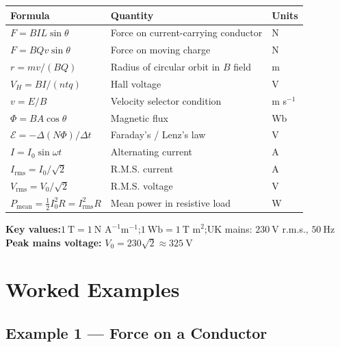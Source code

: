 \begin{minipage}{\linewidth}
\begin{tcolorbox}[colback=lightgold, colframe=accentgold]
\renewcommand{\arraystretch}{1.8}
\begin{tabular}{@{}lll@{}}
\toprule
\textbf{Formula} & \textbf{Quantity} & \textbf{Units} \\
\midrule
$F = BIL\sin\theta$ & Force on current-carrying conductor & N \\
$F = BQv\sin\theta$ & Force on moving charge & N \\
$r = mv/(BQ)$ & Radius of circular orbit in $B$ field & m \\
$V_H = BI/(ntq)$ & Hall voltage & V \\
$v = E/B$ & Velocity selector condition & m s$^{-1}$ \\
$\Phi = BA\cos\theta$ & Magnetic flux & Wb \\
$\mathcal{E} = -\Delta(N\Phi)/\Delta t$ & Faraday's / Lenz's law & V \\
$I = I_0\sin\omega t$ & Alternating current & A \\
$I_{\text{rms}} = I_0/\sqrt{2}$ & R.M.S. current & A \\
$V_{\text{rms}} = V_0/\sqrt{2}$ & R.M.S. voltage & V \\
$P_{\text{mean}} = \tfrac{1}{2}I_0^2 R = I_{\text{rms}}^2 R$ & Mean power in resistive load & W \\
\bottomrule
\end{tabular}
\end{tcolorbox}

\vspace{0.5em}
\begin{tcolorbox}[colback=lightblue, colframe=darkblue]
\textbf{Key values:}\quad $1\ \text{T} = 1\ \text{N A}^{-1}\text{m}^{-1}$;\quad $1\ \text{Wb} = 1\ \text{T m}^2$;\quad UK mains: $230\ \text{V}$ r.m.s., $50\ \text{Hz}$\\[0.3em]
\textbf{Peak mains voltage:} $V_0 = 230\sqrt{2} \approx 325\ \text{V}$
\end{tcolorbox}
\end{minipage}

\section{Worked Examples}

\subsection*{Example 1 — Force on a Conductor}

